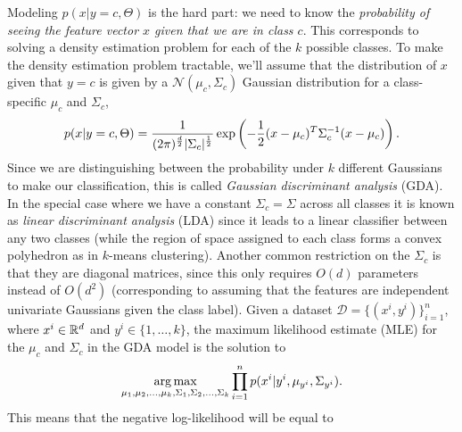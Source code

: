 \documentclass{article}
\begin{document}
Modeling $p(x | y =c, \Theta)$ is the hard part: we need to know the \emph{probability of seeing the feature vector $x$ given that we are in class $c$}. This corresponds to solving a density estimation problem for each of the $k$ possible classes. 
To make the density estimation problem tractable, we'll assume that the distribution of $x$ given that $y=c$ is given by a $\mathcal{N}(\mu_c,\Sigma_c)$ Gaussian distribution for a class-specific $\mu_c$ and $\Sigma_c$,
\[
p(x | y=c, \Theta) = \frac{1}{(2\pi)^{\frac{d}{2}}|\Sigma_c|^{\frac 1 2}}\exp\left(-\frac 1 2 (x-\mu_c)^T\Sigma_c^{-1}(x-\mu_c)\right).
\]
Since we are distinguishing between the probability under $k$ different Gaussians to make our classification, this is called \emph{Gaussian discriminant analysis} (GDA). In the special case where we have a constant $\Sigma_c = \Sigma$ across all classes it is known as \emph{linear discriminant analysis} (LDA) since it leads to a linear classifier between any two classes (while the region of space assigned to each class forms a convex polyhedron as in $k$-means clustering). Another common restriction on the $\Sigma_c$ is that they are diagonal matrices, since this only requires $O(d)$ parameters instead of $O(d^2)$ (corresponding to assuming that the features are independent univariate Gaussians given the class label).
Given a dataset $\mathcal{D}=\{(x^i, y^i)\}_{i=1}^n$, where $x^i\in\mathbb{R}^d$ and $y^i\in\{1,\ldots,k\}$, the maximum likelihood estimate (MLE) for the $\mu_c$ and $\Sigma_c$ in the GDA model is the solution to
\[
\mathop{\rm arg\,max}_{\mu_1,\mu_2,\dots,\mu_k,\Sigma_1,\Sigma_2,\dots,\Sigma_k} \prod_{i=1}^n p(x^i | y^i, \mu_{y^i},\Sigma_{y^i}).
\]
This means that the negative log-likelihood will be  equal to
\end{document}
